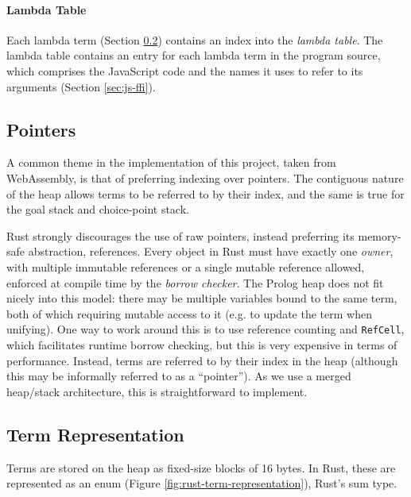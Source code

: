 \vspace*{-2em}

\paragraph{Lambda Table} Each lambda term (Section \ref{sec:term-representation}) contains an index into the \emph{lambda table}. The lambda table contains an entry for each lambda term in the program source, which comprises the JavaScript code and the names it uses to refer to its arguments (Section \ref{sec:js-ffi}).

\subsection{Pointers}

\label{sec:pointers}

A common theme in the implementation of this project, taken from WebAssembly, is that of preferring indexing over pointers. The contiguous nature of the heap allows terms to be referred to by their index, and the same is true for the goal stack and choice-point stack.

Rust strongly discourages the use of raw pointers, instead preferring its memory-safe abstraction, references. Every object in Rust must have exactly one \emph{owner}, with multiple immutable references or a single mutable reference allowed, enforced at compile time by the \emph{borrow checker}. The Prolog heap does not fit nicely into this model: there may be multiple variables bound to the same term, both of which requiring mutable access to it (e.g. to update the term when unifying). One way to work around this is to use reference counting and \texttt{RefCell}, which facilitates runtime borrow checking, but this is very expensive in terms of performance. Instead, terms are referred to by their index in the heap (although this may be informally referred to as a ``pointer''). As we use a merged heap/stack architecture, this is straightforward to implement.

\subsection{Term Representation}

\label{sec:term-representation}

Terms are stored on the heap as fixed-size blocks of 16 bytes. In Rust, these are represented as an enum (Figure \ref{fig:rust-term-representation}), Rust's sum type.

